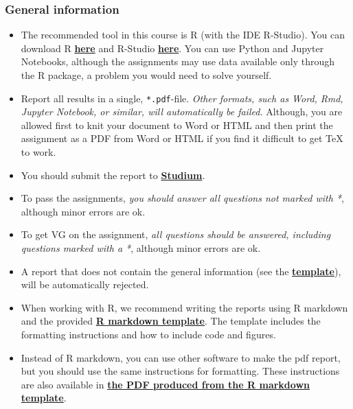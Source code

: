 
\subsubsection*{General information}

\begin{itemize}
\itemsep0em
\item The recommended tool in this course is R (with the IDE R-Studio). You can download R \href{https://cran.r-project.org/}{\textbf{here}} and R-Studio \href{https://www.rstudio.com/products/rstudio/download/}{\textbf{here}}. You can use Python and Jupyter Notebooks, although the assignments may use data available only through the R package, a problem you would need to solve yourself.

\item  Report all results in a single, \texttt{*.pdf}-file. \emph{Other formats, such as Word, Rmd, Jupyter Notebook, or similar, will automatically be failed.} Although, you are allowed first to knit your document to Word or HTML and then print the assignment as a PDF from Word or HTML if you find it difficult to get TeX to work.

\item You should submit the report to \href{https://studium.uu.se/}{\textbf{Studium}}.

\item To pass the assignments, \emph{you should answer all questions not marked with *}, although minor errors are ok.

\item To get VG on the assignment, \emph{all questions should be answered, including questions marked with a *}, although minor errors are ok.

\item A report that does not contain the general information (see the \href{https://raw.githubusercontent.com/MansMeg/IntroML/master/templates/assignment_template.pdf}{\textbf{template}}), will be automatically rejected.

\item When working with R, we recommend writing the reports using R markdown and the provided \href{https://raw.githubusercontent.com/MansMeg/IntroML/master/templates/assignment_template.rmd}{\textbf{R markdown template}}. The template includes the formatting instructions and how to include code and figures.

\item Instead of R markdown, you can use other software to make the pdf report, but you should use the same instructions for formatting. These instructions are also available in \href{https://raw.githubusercontent.com/MansMeg/IntroML/master/templates/assignment_template.pdf}{\textbf{the PDF produced from the R markdown template}}.


\end{itemize}
